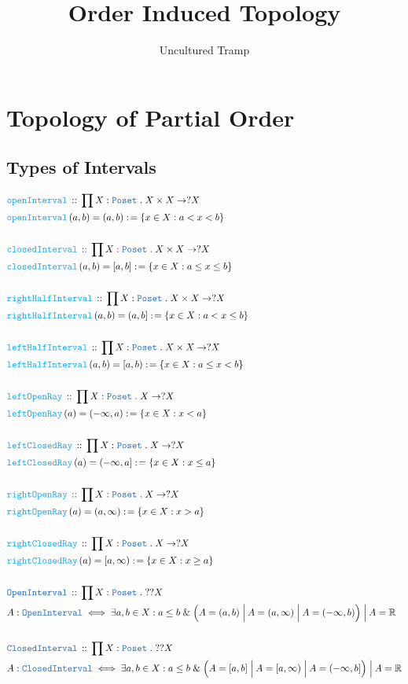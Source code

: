 \documentclass[12pt]{scrartcl}
\author{Uncultured Tramp}
\title{Order Induced Topology}
\newcommand{\TYPE}[1]{\textcolor{NavyBlue}{\mathtt{#1}}}
\newcommand{\FUNC}[1]{\textcolor{Cerulean}{\mathtt{#1}}}
\renewcommand{\.}{\; . \;}
\newcommand{\de}{: \kern 0.1pc =}
\newcommand{\Act}[1]{\left( #1 \right)}
\newcommand{\DeclareType}[2]{& \TYPE{#1} \, :: \, #2 \\}
\newcommand{\DefineType}[3]{& #1 : \TYPE{#2} \iff #3 \\}
\newcommand{\DeclareFunc}[2]{& \FUNC{#1} \, :: \, #2 \\}
\newcommand{\DefineNamedFunc}[4]{&  \FUNC{#1}\Act{#2} = #3 \de #4 \\}
\newcommand{\Page}[1]{ \begin{align*} #1 \end{align*}   }
\renewcommand{\And}{\; \& \;}
\newcommand{\Or}{\; \Big| \:}
\newcommand{\Reals}{\mathbb{R} }
\begin{document}
\maketitle
\newpage
\tableofcontents
\newpage
\section{Topology of Partial Order}
\subsection{Types of Intervals}
\Page{
	\DeclareFunc{openInterval}{ \prod X : \TYPE{Poset} \. X \times X \to ?X  }
	\DefineNamedFunc{openInterval}{a,b}{(a,b)}{\{ x \in X : a < x < b \}}
	\\
	\DeclareFunc{closedInterval}{ \prod X : \TYPE{Poset} \. X \times X \to ?X  }
	\DefineNamedFunc{closedInterval}{a,b}{[a,b]}{ \{ x \in X : a \le x \le b \}  }
	\\
	\DeclareFunc{rightHalfInterval}{\prod X : \TYPE{Poset} \. X \times X \to ?X}
	\DefineNamedFunc{rightHalfInterval}{a,b}{(a,b]}{ \{ x \in X : a < x \le b   \} }
	\\
	\DeclareFunc{leftHalfInterval}{\prod X : \TYPE{Poset} \. X \times X \to ?X}
	\DefineNamedFunc{leftHalfInterval}{a,b}{[a,b)}{\{ x \in X : a \le x < b \}}
	\\
	\DeclareFunc{leftOpenRay}{\prod X : \TYPE{Poset} \. X \to ?X }
	\DefineNamedFunc{leftOpenRay}{a}{  (-\infty, a)  }{ \{ x \in X : x < a  \} }
	\\
	\DeclareFunc{leftClosedRay}{\prod X : \TYPE{Poset} \. X \to ?X}
	\DefineNamedFunc{leftClosedRay}{a}{ (-\infty,a] }{\{ x \in X : x \le a \}}
	\\
	\DeclareFunc{rightOpenRay}{\prod X : \TYPE{Poset} \. X \to ?X}
	\DefineNamedFunc{rightOpenRay}{a}{ (a, \infty)  }{ \{ x \in X : x > a \} }
	\\
	\DeclareFunc{rightClosedRay}{\prod X : \TYPE{Poset} \. X \to ?X}
	\DefineNamedFunc{rightClosedRay}{a}{[a, \infty)}{ \{ x \in X : x \ge a \}}
	\\
	\DeclareType{OpenInterval}{\prod X : \TYPE{Poset} \. ??X}
	\DefineType{A}{OpenInterval}{ \exists a,b \in X : a \le b \And 
		\Big(A = (a,b) \Or A = (a,\infty) \Or A = (-\infty,b) \Big) \Or A = \Reals }
	\\
	\DeclareType{ClosedInterval}{\prod X : \TYPE{Poset} \. ??X}
	\DefineType{A}{ClosedInterval}{\exists a,b \in X : a \le b \And 
		\Big( A = [a,b] \Or A = [a,\infty) \Or A = (-\infty,b] \Big) \Or A = \Reals }
}
\end{document}

